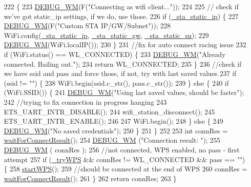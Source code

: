\begin{DoxyCode}
222                                                      \{
223   \hyperlink{class_wi_fi_manager_ae5f595c670ccbcf9a191baf50f5c7c26}{DEBUG\_WM}(F(\textcolor{stringliteral}{"Connecting as wifi client..."}));
224 
225   \textcolor{comment}{// check if we've got static\_ip settings, if we do, use those.}
226   \textcolor{keywordflow}{if} (\hyperlink{class_wi_fi_manager_ad90d356096742a43b4540117b92faff0}{\_sta\_static\_ip}) \{
227     \hyperlink{class_wi_fi_manager_ae5f595c670ccbcf9a191baf50f5c7c26}{DEBUG\_WM}(F(\textcolor{stringliteral}{"Custom STA IP/GW/Subnet"}));
228     WiFi.config(\hyperlink{class_wi_fi_manager_ad90d356096742a43b4540117b92faff0}{\_sta\_static\_ip}, \hyperlink{class_wi_fi_manager_a36648ca4819dc0feedaf9e1987d56d96}{\_sta\_static\_gw}, 
      \hyperlink{class_wi_fi_manager_a3fd337255bce688189f9d450cc0ca3a3}{\_sta\_static\_sn});
229     \hyperlink{class_wi_fi_manager_ae5f595c670ccbcf9a191baf50f5c7c26}{DEBUG\_WM}(WiFi.localIP());
230   \}
231   \textcolor{comment}{//fix for auto connect racing issue}
232   \textcolor{keywordflow}{if} (WiFi.status() == WL\_CONNECTED) \{
233     \hyperlink{class_wi_fi_manager_ae5f595c670ccbcf9a191baf50f5c7c26}{DEBUG\_WM}(\textcolor{stringliteral}{"Already connected. Bailing out."});
234     \textcolor{keywordflow}{return} WL\_CONNECTED;
235   \}
236   \textcolor{comment}{//check if we have ssid and pass and force those, if not, try with last saved values}
237   \textcolor{keywordflow}{if} (ssid != \textcolor{stringliteral}{""}) \{
238     WiFi.begin(ssid.c\_str(), pass.c\_str());
239   \} \textcolor{keywordflow}{else} \{
240     \textcolor{keywordflow}{if} (WiFi.SSID()) \{
241       \hyperlink{class_wi_fi_manager_ae5f595c670ccbcf9a191baf50f5c7c26}{DEBUG\_WM}(\textcolor{stringliteral}{"Using last saved values, should be faster"});
242       \textcolor{comment}{//trying to fix connection in progress hanging}
243       ETS\_UART\_INTR\_DISABLE();
244       wifi\_station\_disconnect();
245       ETS\_UART\_INTR\_ENABLE();
246 
247       WiFi.begin();
248     \} \textcolor{keywordflow}{else} \{
249       \hyperlink{class_wi_fi_manager_ae5f595c670ccbcf9a191baf50f5c7c26}{DEBUG\_WM}(\textcolor{stringliteral}{"No saved credentials"});
250     \}
251   \}
252 
253   \textcolor{keywordtype}{int} connRes = \hyperlink{class_wi_fi_manager_a89a3f33997aa662ad223d6c150c1eede}{waitForConnectResult}();
254   \hyperlink{class_wi_fi_manager_ae5f595c670ccbcf9a191baf50f5c7c26}{DEBUG\_WM} (\textcolor{stringliteral}{"Connection result: "});
255   \hyperlink{class_wi_fi_manager_ae5f595c670ccbcf9a191baf50f5c7c26}{DEBUG\_WM} ( connRes );
256   \textcolor{comment}{//not connected, WPS enabled, no pass - first attempt}
257   \textcolor{keywordflow}{if} (\hyperlink{class_wi_fi_manager_aad7bf8cc9ff4bf7603f9ce42923c9df1}{\_tryWPS} && connRes != WL\_CONNECTED && pass == \textcolor{stringliteral}{""}) \{
258     \hyperlink{class_wi_fi_manager_abcc403fc26a47f7a111d1271f1d0869e}{startWPS}();
259     \textcolor{comment}{//should be connected at the end of WPS}
260     connRes = \hyperlink{class_wi_fi_manager_a89a3f33997aa662ad223d6c150c1eede}{waitForConnectResult}();
261   \}
262   \textcolor{keywordflow}{return} connRes;
263 \}
\end{DoxyCode}
